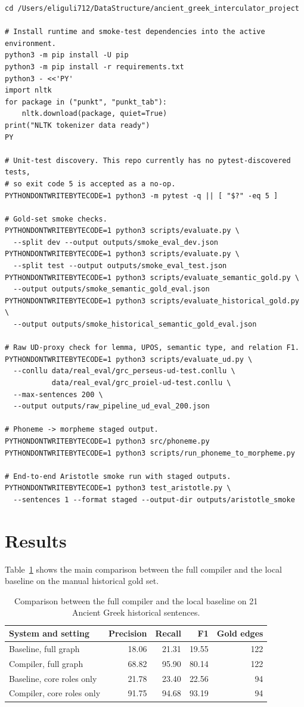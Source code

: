 \documentclass[11pt]{article}
\begin{document}
\begin{verbatim}
cd /Users/eliguli712/DataStructure/ancient_greek_interculator_project

# Install runtime and smoke-test dependencies into the active environment.
python3 -m pip install -U pip
python3 -m pip install -r requirements.txt
python3 - <<'PY'
import nltk
for package in ("punkt", "punkt_tab"):
    nltk.download(package, quiet=True)
print("NLTK tokenizer data ready")
PY

# Unit-test discovery. This repo currently has no pytest-discovered tests,
# so exit code 5 is accepted as a no-op.
PYTHONDONTWRITEBYTECODE=1 python3 -m pytest -q || [ "$?" -eq 5 ]

# Gold-set smoke checks.
PYTHONDONTWRITEBYTECODE=1 python3 scripts/evaluate.py \
  --split dev --output outputs/smoke_eval_dev.json
PYTHONDONTWRITEBYTECODE=1 python3 scripts/evaluate.py \
  --split test --output outputs/smoke_eval_test.json
PYTHONDONTWRITEBYTECODE=1 python3 scripts/evaluate_semantic_gold.py \
  --output outputs/smoke_semantic_gold_eval.json
PYTHONDONTWRITEBYTECODE=1 python3 scripts/evaluate_historical_gold.py \
  --output outputs/smoke_historical_semantic_gold_eval.json

# Raw UD-proxy check for lemma, UPOS, semantic type, and relation F1.
PYTHONDONTWRITEBYTECODE=1 python3 scripts/evaluate_ud.py \
  --conllu data/real_eval/grc_perseus-ud-test.conllu \
           data/real_eval/grc_proiel-ud-test.conllu \
  --max-sentences 200 \
  --output outputs/raw_pipeline_ud_eval_200.json

# Phoneme -> morpheme staged output.
PYTHONDONTWRITEBYTECODE=1 python3 src/phoneme.py
PYTHONDONTWRITEBYTECODE=1 python3 scripts/run_phoneme_to_morpheme.py

# End-to-end Aristotle smoke run with staged outputs.
PYTHONDONTWRITEBYTECODE=1 python3 test_aristotle.py \
  --sentences 1 --format staged --output-dir outputs/aristotle_smoke
\end{verbatim}

\section{Results}
Table~\ref{tab:historical-results} shows the main comparison between the full
compiler and the local baseline on the manual historical gold set.

\begin{table}[t]
\centering
\caption{Comparison between the full compiler and the local baseline on 21
Ancient Greek historical sentences.}
\label{tab:historical-results}
\begin{tabular}{lrrrr}
\toprule
System and setting & Precision & Recall & F1 & Gold edges \\
\midrule
Baseline, full graph & 18.06 & 21.31 & 19.55 & 122 \\
Compiler, full graph & 68.82 & 95.90 & 80.14 & 122 \\
Baseline, core roles only & 21.78 & 23.40 & 22.56 & 94 \\
Compiler, core roles only & 91.75 & 94.68 & 93.19 & 94 \\
\bottomrule
\end{tabular}
\end{table}
\end{document}

